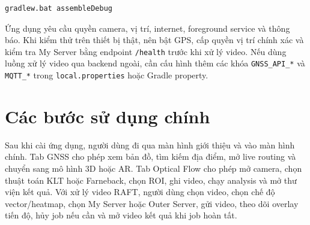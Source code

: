 \documentclass[../DoAn.tex]{subfiles}
\begin{document}
\begin{lstlisting}[language=bash,caption={Build debug APK}]
gradlew.bat assembleDebug
\end{lstlisting}

Ứng dụng yêu cầu quyền camera, vị trí, internet, foreground service và thông báo. Khi kiểm thử trên thiết bị thật, nên bật GPS, cấp quyền vị trí chính xác và kiểm tra My Server bằng endpoint \texttt{/health} trước khi xử lý video. Nếu dùng luồng xử lý video qua backend ngoài, cần cấu hình thêm các khóa \texttt{GNSS\_API\_*} và \texttt{MQTT\_*} trong \texttt{local.properties} hoặc Gradle property.

\section{Các bước sử dụng chính}
Sau khi cài ứng dụng, người dùng đi qua màn hình giới thiệu và vào màn hình chính. Tab GNSS cho phép xem bản đồ, tìm kiếm địa điểm, mở live routing và chuyển sang mô hình 3D hoặc AR. Tab Optical Flow cho phép mở camera, chọn thuật toán KLT hoặc Farneback, chọn ROI, ghi video, chạy analysis và mở thư viện kết quả. Với xử lý video RAFT, người dùng chọn video, chọn chế độ vector/heatmap, chọn My Server hoặc Outer Server, gửi video, theo dõi overlay tiến độ, hủy job nếu cần và mở video kết quả khi job hoàn tất.
\end{document}
